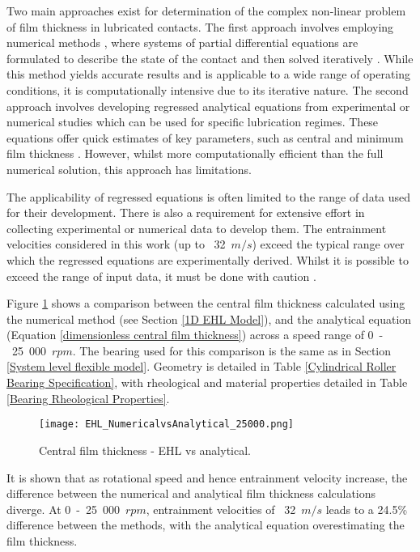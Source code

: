 Two main approaches exist for determination of the complex non-linear problem of film thickness in lubricated contacts. The first approach involves employing numerical methods \cite{Dowson1959}, where systems of partial differential equations are formulated to describe the state of the contact and then solved iteratively \cite{Gohar2018}. While this method yields accurate results and is applicable to a wide range of operating conditions, it is computationally intensive due to its iterative nature. The second approach involves developing regressed analytical equations from experimental or numerical studies which can be used for specific lubrication regimes. These equations offer quick estimates of key parameters, such as central \cite{Dowson1979} and minimum film thickness \cite{Dowson1967}. However, whilst more computationally efficient than the full numerical solution, this approach has limitations.
 
The applicability of regressed equations is often limited to the range of data used for their development. There is also a requirement for extensive effort in collecting experimental or numerical data to develop them. The entrainment velocities considered in this work (up to ~32~$m/s$) exceed the typical range over which the regressed equations are experimentally derived. Whilst it is possible to exceed the range of input data, it must be done with caution \cite{Gohar1988}.

Figure \ref{EHL_NumericalvsAnalytical_25000} shows a comparison between the central film thickness calculated using the numerical method (see Section \ref{1D EHL Model}), and the analytical equation (Equation \ref{dimensionless central film thickness}) across a speed range of 0~-~25~000~$rpm$. The bearing used for this comparison is the same as in Section \ref{System level flexible model}. Geometry is detailed in Table \ref{Cylindrical Roller Bearing Specification}, with rheological and material properties detailed in Table \ref{Bearing Rheological Properties}.

\begin{figure}
	\centering
	\texttt{[image: EHL\_NumericalvsAnalytical\_25000.png]}
	\caption{Central film thickness - EHL vs analytical.}
	\label{EHL_NumericalvsAnalytical_25000}
\end{figure} 

It is shown that as rotational speed and hence entrainment velocity increase, the difference between the numerical and analytical film thickness calculations diverge. At 0~-~25~000~$rpm$, entrainment velocities of ~32~$m/s$ leads to a 24.5\% difference between the methods, with the analytical equation overestimating the film thickness.

